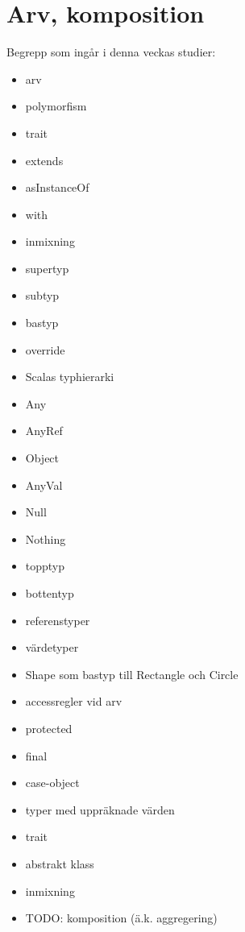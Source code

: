 \chapter{Arv, komposition}\label{chapter:W10}
Begrepp som ingår i denna veckas studier:
\begin{multicols}{2}\begin{itemize}[noitemsep,label={$\square$},leftmargin=*]
\item arv
\item polymorfism
\item trait
\item extends
\item asInstanceOf
\item with
\item inmixning
\item supertyp
\item subtyp
\item bastyp
\item override
\item Scalas typhierarki
\item Any
\item AnyRef
\item Object
\item AnyVal
\item Null
\item Nothing
\item topptyp
\item bottentyp
\item referenstyper
\item värdetyper
\item Shape som bastyp till Rectangle och Circle
\item accessregler vid arv
\item protected
\item final
\item case-object
\item typer med uppräknade värden
\item trait
\item abstrakt klass
\item inmixning
\item TODO: komposition (ä.k. aggregering)\end{itemize}\end{multicols}

